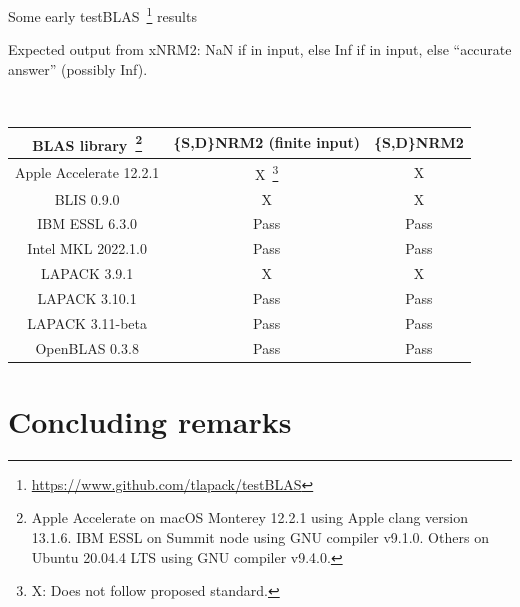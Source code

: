 \documentclass[11pt]{beamer}
\begin{document}
\begin{frame}{Some early testBLAS~\footnote{\url{https://www.github.com/tlapack/testBLAS}} results}

	Expected output from xNRM2: NaN if in input, else Inf if in input, else ``accurate answer'' (possibly Inf).

	~\\
		\centering
		\begin{tabular}{|c|c|c|}
			\hline
			BLAS library~\footnote{Apple Accelerate on macOS Monterey 12.2.1 using Apple clang version 13.1.6. IBM ESSL on Summit node using GNU compiler v9.1.0. Others on Ubuntu 20.04.4 LTS using GNU compiler v9.4.0.} & \{S,D\}NRM2 (finite input) & \{S,D\}NRM2 \\\hline
			Apple Accelerate 12.2.1 & {X~\footnote{X: Does not follow proposed standard.}} & {X} \\\hline
			BLIS 0.9.0 & {X} & {X} \\\hline
			IBM ESSL 6.3.0 & {\color{codegreen} Pass} & {\color{codegreen} Pass} \\\hline
			Intel MKL 2022.1.0 & {\color{codegreen} Pass} & {\color{codegreen} Pass} \\\hline
			LAPACK 3.9.1 & {X} & {X} \\\hline
			LAPACK 3.10.1 & {\color{codegreen} Pass} & {\color{codegreen} Pass} \\\hline
			LAPACK 3.11-beta & {\color{codegreen} Pass} & {\color{codegreen} Pass} \\\hline
			OpenBLAS 0.3.8 & {\color{codegreen} Pass} & {\color{codegreen} Pass} \\\hline
		\end{tabular}

\end{frame}

\section{Concluding remarks}
\end{document}
